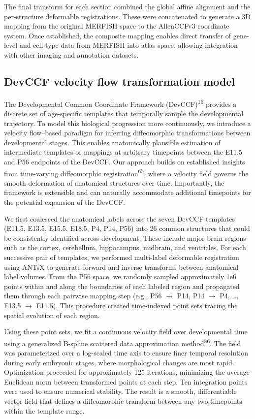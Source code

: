 \documentclass[
  12pt,
]{article}
\begin{document}
The final transform for each section combined the global affine
alignment and the per-structure deformable registrations. These were
concatenated to generate a 3D mapping from the original MERFISH space to
the AllenCCFv3 coordinate system. Once established, the composite
mapping enables direct transfer of gene-level and cell-type data from
MERFISH into atlas space, allowing integration with other imaging and
annotation datasets.

\subsection{DevCCF velocity flow transformation
model}\label{devccf-velocity-flow-transformation-model}

The Developmental Common Coordinate Framework
(DevCCF)\textsuperscript{16} provides a discrete set of age-specific
templates that temporally sample the developmental trajectory. To model
this biological progression more continuously, we introduce a velocity
flow--based paradigm for inferring diffeomorphic transformations between
developmental stages. This enables anatomically plausible estimation of
intermediate templates or mappings at arbitrary timepoints between the
E11.5 and P56 endpoints of the DevCCF. Our approach builds on
established insights from time-varying diffeomorphic
registration\textsuperscript{65}, where a velocity field governs the
smooth deformation of anatomical structures over time. Importantly, the
framework is extensible and can naturally accommodate additional
timepoints for the potential expansion of the DevCCF.

We first coalesced the anatomical labels across the seven DevCCF
templates (E11.5, E13.5, E15.5, E18.5, P4, P14, P56) into 26 common
structures that could be consistently identified across development.
These include major brain regions such as the cortex, cerebellum,
hippocampus, midbrain, and ventricles. For each successive pair of
templates, we performed multi-label deformable registration using ANTsX
to generate forward and inverse transforms between anatomical label
volumes. From the P56 space, we randomly sampled approximately 1e6
points within and along the boundaries of each labeled region and
propagated them through each pairwise mapping step (e.g., P56
\(\rightarrow\) P14, P14 \(\rightarrow\) P4, \ldots, E13.5
\(\rightarrow\) E11.5). This procedure created time-indexed point sets
tracing the spatial evolution of each region.

Using these point sets, we fit a continuous velocity field over
developmental time using a generalized B-spline scattered data
approximation method\textsuperscript{86}. The field was parameterized
over a log-scaled time axis to ensure finer temporal resolution during
early embryonic stages, where morphological changes are most rapid.
Optimization proceeded for approximately 125 iterations, minimizing the
average Euclidean norm between transformed points at each step. Ten
integration points were used to ensure numerical stability. The result
is a smooth, differentiable vector field that defines a diffeomorphic
transform between any two timepoints within the template range.
\end{document}
